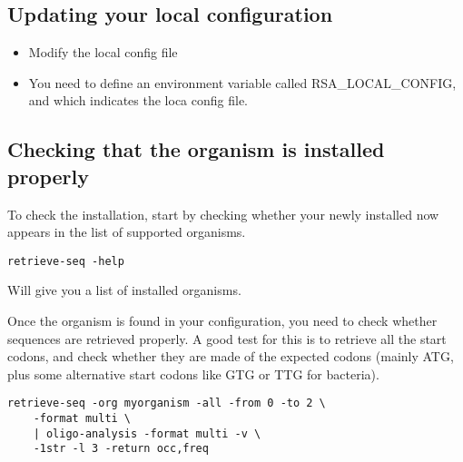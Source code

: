 \subsection{Updating your local configuration}

\begin{itemize}
\item Modify the local config file

\item You need to define an environment variable called
RSA\_LOCAL\_CONFIG, and which indicates the loca config file.

\end{itemize}

\subsection{Checking that the organism is installed properly}

To check the installation, start by checking whether your newly
installed now appears in the list of supported organisms.

\begin{verbatim}
retrieve-seq -help
\end{verbatim}

Will give you a list of installed organisms.

Once the organism is found in your configuration, you need to check
whether sequences are retrieved properly. A good test for this is to
retrieve all the start codons, and check whether they are made of the
expected codons (mainly ATG, plus some alternative start codons like
GTG or TTG for bacteria).

\begin{verbatim}
retrieve-seq -org myorganism -all -from 0 -to 2 \
    -format multi \
    | oligo-analysis -format multi -v \
    -1str -l 3 -return occ,freq
\end{verbatim}
